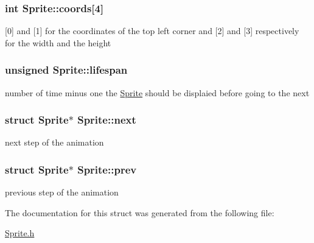 \subsubsection[{\texorpdfstring{coords}{coords}}]{\setlength{\rightskip}{0pt plus 5cm}int Sprite\+::coords\mbox{[}4\mbox{]}}\hypertarget{structSprite_a63a82c9db293f2a0b9a043894cea93ce}{}\label{structSprite_a63a82c9db293f2a0b9a043894cea93ce}
\mbox{[}0\mbox{]} and \mbox{[}1\mbox{]} for the coordinates of the top left corner and \mbox{[}2\mbox{]} and \mbox{[}3\mbox{]} respectively for the width and the height 
\subsubsection[{\texorpdfstring{lifespan}{lifespan}}]{\setlength{\rightskip}{0pt plus 5cm}unsigned Sprite\+::lifespan}\hypertarget{structSprite_ac7deb2af6710a22bec013f2214fc0df7}{}\label{structSprite_ac7deb2af6710a22bec013f2214fc0df7}
number of time minus one the \hyperlink{structSprite}{Sprite} should be displaied before going to the next 
\subsubsection[{\texorpdfstring{next}{next}}]{\setlength{\rightskip}{0pt plus 5cm}struct {\bf Sprite}$\ast$ Sprite\+::next}\hypertarget{structSprite_a52b8df63621811a2835cd11ba69cebfb}{}\label{structSprite_a52b8df63621811a2835cd11ba69cebfb}
next step of the animation 
\subsubsection[{\texorpdfstring{prev}{prev}}]{\setlength{\rightskip}{0pt plus 5cm}struct {\bf Sprite}$\ast$ Sprite\+::prev}\hypertarget{structSprite_a2c09859f5f18f9d8272171eb43bf66e8}{}\label{structSprite_a2c09859f5f18f9d8272171eb43bf66e8}
previous step of the animation 

The documentation for this struct was generated from the following file\+:\begin{DoxyCompactItemize}
\item 
\hyperlink{Sprite_8h}{Sprite.\+h}\end{DoxyCompactItemize}
